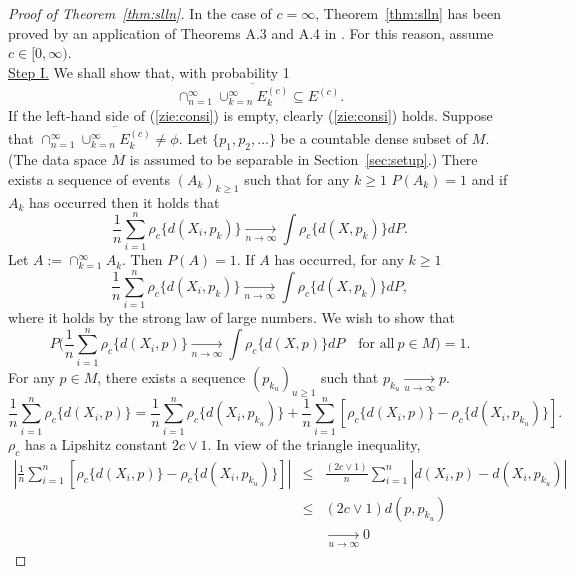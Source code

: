 \documentclass[preprint]{imsart}
\theoremstyle{plain}
\theoremstyle{remark}
\begin{document}
\begin{appendix}
\begin{proof}[Proof of Theorem~\ref{thm:slln}]
In the case of $c=\infty$, Theorem~\ref{thm:slln} has been proved by an application of Theorems A.3 and A.4 in \cite{huckemann2011intrinsic}. For this reason, assume $c\in [0, \infty)$. \\ 
\underline{Step I.} We shall show that, with probability 1
\begin{equation}\label{zie:consi}
\cap_{n=1}^{\infty} \overline{\cup_{k=n}^{\infty} E^{(c)}_{k}} \subseteq E^{(c)}.
\end{equation}
If the left-hand side of (\ref{zie:consi}) is empty, clearly (\ref{zie:consi}) holds. Suppose that $\cap_{n=1}^{\infty} \overline{\cup_{k=n}^{\infty} E^{(c)}_{k}} \neq \phi$. Let $\{p_1, p_2, ... \}$ be a countable dense subset of $M$. (The data space $M$ is assumed to be separable in Section~\ref{sec:setup}.) There exists a sequence of events $(A_{k})_{k \ge 1}$ such that for any $k \ge 1$ $P(A_k)=1$ and if $A_k$ has occurred then it holds that
\[
\frac{1}{n}\sum_{i=1}^{n} \rho_{c}\{d(X_i, p_k)\} \underset{n \rightarrow \infty}{\rightarrow} \int \rho_{c}\{d(X, p_k)\} dP. 
\]
Let $A:= \cap_{k=1}^{\infty} A_k$. Then $P(A)=1$. If $A$ has occurred, for any $k\ge 1$
\[
\frac{1}{n}\sum_{i=1}^{n} \rho_{c}\{d(X_i, p_k)\} \underset{n \rightarrow \infty}{\rightarrow} \int \rho_{c}\{d(X, p_k)\} dP, 
\]
where it holds by the strong law of large numbers. We wish to show that 
\[
P\big(\frac{1}{n}\sum_{i=1}^{n} \rho_{c}\{d(X_i, p)\} \underset{n \rightarrow \infty}{\rightarrow} \int \rho_{c}\{d(X, p)\} dP \quad \mbox{for all}~ p \in M \big) = 1.
\]
For any $p \in M$, there exists a sequence $(p_{k_{u}})_{u \ge 1}$ such that $p_{k_u} \underset{u \rightarrow \infty}{\rightarrow} p$.  
\begin{equation}\label{split}
\frac{1}{n} \sum_{i=1}^{n} \rho_{c}\{d(X_i, p)\} = \frac{1}{n} \sum_{i=1}^{n} \rho_{c}\{d(X_i, p_{k_{u}})\} + \frac{1}{n} \sum_{i=1}^{n} [\rho_{c}\{d(X_i, p)\} - \rho_{c}\{d(X_i, p_{k_{u}})\}]. 
\end{equation}
$\rho_{c}$ has a Lipshitz constant $2c \lor 1$. In view of the triangle inequality, 
\begin{eqnarray*}
|\frac{1}{n} \sum_{i=1}^{n} [\rho_{c}\{d(X_i, p)\} - \rho_{c}\{d(X_i, p_{k_{u}})\}]| &\le& \frac{(2c \lor 1)}{n} \sum_{i=1}^{n} |d(X_i, p) - d(X_i, p_{k_{u}})| \\ 
&\le& (2c \lor 1) d(p, p_{k_{u}}) \\
& & \underset{u \rightarrow \infty}{\rightarrow} 0
\end{eqnarray*}

\end{proof}
\end{appendix}
\end{document}
